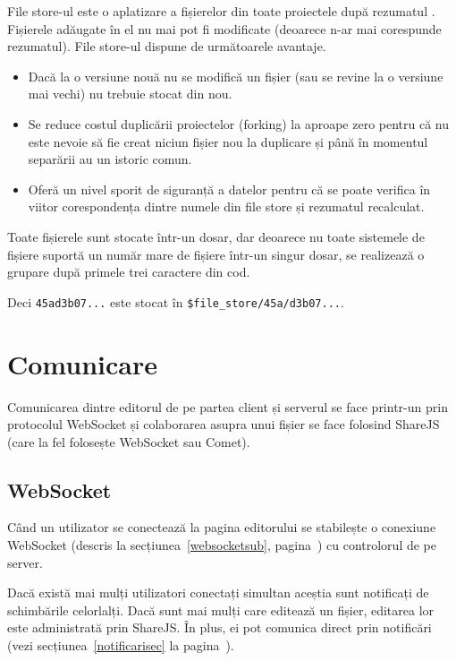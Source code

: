 \documentclass[a4wide,12pt]{report}
\newcommand{\eng}[1]{{#1}} %
\newcommand{\cod}[1]{\texttt{#1}}
\newcommand{\acr}[1]{{\textsmaller[1]{\textsc{#1}}}} %
\begin{document}
\eng{File store}-ul este o aplatizare a fișierelor din toate proiectele după
rezumatul \acr{SHA1}. Fișierele adăugate în el nu mai pot fi modificate
(deoarece n-ar mai corespunde rezumatul). \eng{File store}-ul dispune de
următoarele avantaje.

\begin{itemize}

\item Dacă la o versiune nouă nu se modifică un fișier (sau se revine la o
versiune mai vechi) nu trebuie stocat din nou.

\item Se reduce costul duplicării proiectelor (\eng{forking}) la aproape zero
pentru că nu este nevoie să fie creat niciun fișier nou la duplicare și până în
momentul separării au un istoric comun.

\item Oferă un nivel sporit de siguranță a datelor pentru că se poate verifica
în viitor corespondența dintre numele din \eng{file store} și rezumatul
\acr{SHA1} recalculat.

\end{itemize}

Toate fișierele sunt stocate într-un dosar, dar deoarece nu toate sistemele de
fișiere suportă un număr mare de fișiere într-un singur dosar, se realizează o
grupare după primele trei caractere din cod.

Deci \cod{45ad3b07...} este stocat în \cod{\$file\_store/45a/d3b07...}.

\section{Comunicare}

Comunicarea dintre editorul de pe partea client și serverul se face printr-un
\acr{RPC} prin protocolul WebSocket și colaborarea asupra unui fișier se face
folosind ShareJS (care la fel folosește WebSocket sau Comet).

\subsection{WebSocket}

Când un utilizator se conectează la pagina editorului se stabilește o conexiune
WebSocket (descris la secțiunea~\ref{websocketsub},
pagina~\pageref{websocketsub}) cu controlorul de pe server.

Dacă există mai mulți utilizatori conectați simultan aceștia sunt notificați de
schimbările celorlalți. Dacă sunt mai mulți care editează un fișier, editarea
lor este administrată prin ShareJS. În plus, ei pot comunica direct prin
notificări (vezi secțiunea~\ref{notificarisec} la
pagina~\pageref{notificarisec}).
\end{document}
